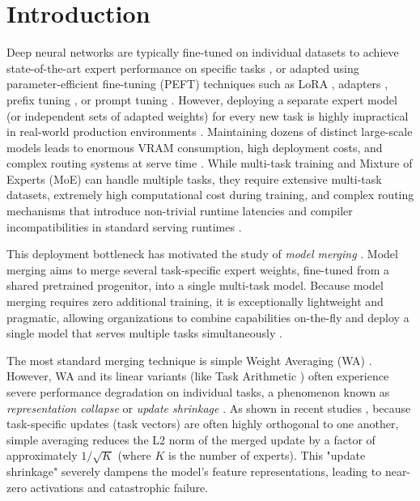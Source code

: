 \documentclass{article}
\theoremstyle{plain}
\theoremstyle{definition}
\theoremstyle{remark}
\begin{document}
\section{Introduction}
\label{submission3:sec:intro}

Deep neural networks are typically fine-tuned on individual datasets to achieve state-of-the-art expert performance on specific tasks \cite{devlin2018bert, wortsman2022robust}, or adapted using parameter-efficient fine-tuning (PEFT) techniques such as LoRA \cite{hu2021lora}, adapters \cite{houlsby2019parameter}, prefix tuning \cite{li2021prefix}, or prompt tuning \cite{lester2021power}.
However, deploying a separate expert model (or independent sets of adapted weights) for every new task is highly impractical in real-world production environments \cite{serving_latency_survey, Lee2022_multitask}.
Maintaining dozens of distinct large-scale models leads to enormous VRAM consumption, high deployment costs, and complex routing systems at serve time \cite{Lee2022_multitask}.
While multi-task training \cite{caruana1997multitask} and Mixture of Experts (MoE) \cite{vaswani2017attention, shazeer2017outrageously, fedus2022switch} can handle multiple tasks, they require extensive multi-task datasets, extremely high computational cost during training, and complex routing mechanisms that introduce non-trivial runtime latencies and compiler incompatibilities in standard serving runtimes \cite{kwon2023vllm}.

This deployment bottleneck has motivated the study of \emph{model merging} \cite{mcmahan2017communication, izmailov2018averaging, ilharco2022editing}.
Model merging aims to merge several task-specific expert weights, fine-tuned from a shared pretrained progenitor, into a single multi-task model.
Because model merging requires zero additional training, it is exceptionally lightweight and pragmatic, allowing organizations to combine capabilities on-the-fly and deploy a single model that serves multiple tasks simultaneously \cite{Wang2024_parameter_space_merging}.

The most standard merging technique is simple Weight Averaging (WA) \cite{mcmahan2017communication}.
However, WA and its linear variants (like Task Arithmetic \cite{ilharco2022editing}) often experience severe performance degradation on individual tasks, a phenomenon known as \emph{representation collapse} or \emph{update shrinkage} \cite{orthogonal_collapse}.
As shown in recent studies \cite{submission9_reference}, because task-specific updates (task vectors) are often highly orthogonal to one another, simple averaging reduces the L2 norm of the merged update by a factor of approximately $1/\sqrt{K}$ (where $K$ is the number of experts).
This "update shrinkage" severely dampens the model's feature representations, leading to near-zero activations and catastrophic failure.
\end{document}
